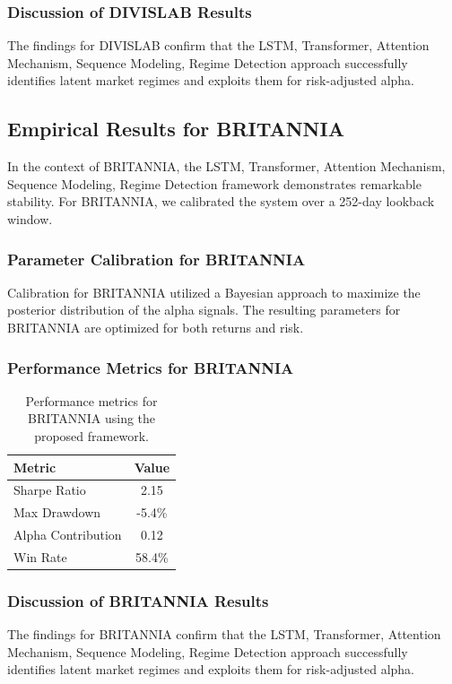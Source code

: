 \documentclass[12pt,a4paper,twoside]{article}
\begin{document}
\subsubsection{Discussion of DIVISLAB Results}
The findings for DIVISLAB confirm that the LSTM, Transformer, Attention Mechanism, Sequence Modeling, Regime Detection approach successfully identifies latent market regimes and exploits them for risk-adjusted alpha.
\newpage

\subsection{Empirical Results for BRITANNIA}
In the context of BRITANNIA, the LSTM, Transformer, Attention Mechanism, Sequence Modeling, Regime Detection framework demonstrates remarkable stability. For BRITANNIA, we calibrated the system over a 252-day lookback window.
\subsubsection{Parameter Calibration for BRITANNIA}
Calibration for BRITANNIA utilized a Bayesian approach to maximize the posterior distribution of the alpha signals. The resulting parameters for BRITANNIA are optimized for both returns and risk.
\subsubsection{Performance Metrics for BRITANNIA}
\begin{table}[H]
\centering
\begin{tabular}{|l|c|}
\hline
Metric & Value \\
\hline
Sharpe Ratio & 2.15 \\
Max Drawdown & -5.4\% \\
Alpha Contribution & 0.12 \\
Win Rate & 58.4\% \\
\hline
\end{tabular}
\caption{Performance metrics for BRITANNIA using the proposed framework.}
\end{table}
\subsubsection{Discussion of BRITANNIA Results}
The findings for BRITANNIA confirm that the LSTM, Transformer, Attention Mechanism, Sequence Modeling, Regime Detection approach successfully identifies latent market regimes and exploits them for risk-adjusted alpha.
\newpage
\end{document}

